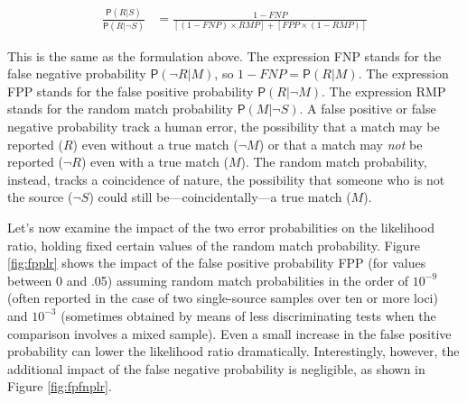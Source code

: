 \documentclass[
  10pt,
  dvipsnames,enabledeprecatedfontcommands]{scrartcl}
\newcommand{\n}{\neg}
\newcommand{\pr}[1]{\mathsf{P}(#1)}
\begin{document}
\begin{align}
\label{eq:LRfp4b}
\frac{\pr{R \vert S}}{\pr{R \vert \neg S}} & = \frac{1-FNP}{[(1-FNP)\times RMP] + [ FPP \times (1-RMP)]}
\end{align}

\noindent This is the same as the formulation above. The expression FNP
stands for the false negative probability \(\pr{\neg R \vert M}\), so
\(1-FNP=\pr{R \vert M}\). The expression FPP stands for the false
positive probability \(\pr{R \vert \n M}\). The expression RMP stands
for the random match probability \(\pr{M\vert \n S}\). A false positive
or false negative probability track a human error, the possibility that
a match may be reported (\(R\)) even without a true match (\(\neg M\))
or that a match may \textit{not} be reported (\(\neg R\)) even with a
true match (\(M\)). The random match probability, instead, tracks a
coincidence of nature, the possibility that someone who is not the
source (\(\neg S\)) could still be---coincidentally---a true match
(\(M\)).

Let's now examine the impact of the two error probabilities on the
likelihood ratio, holding fixed certain values of the random match
probability. Figure \ref{fig:fpplr} shows the impact of the false
positive probability FPP (for values between 0 and .05) assuming random
match probabilities in the order of \(10^{-9}\) (often reported in the
case of two single-source samples over ten or more loci) and \(10^{-3}\)
(sometimes obtained by means of less discriminating tests when the
comparison involves a mixed sample). Even a small increase in the false
positive probability can lower the likelihood ratio dramatically.
Interestingly, however, the additional impact of the false negative
probability is negligible, as shown in Figure \ref{fig:fpfnplr}.
\end{document}

